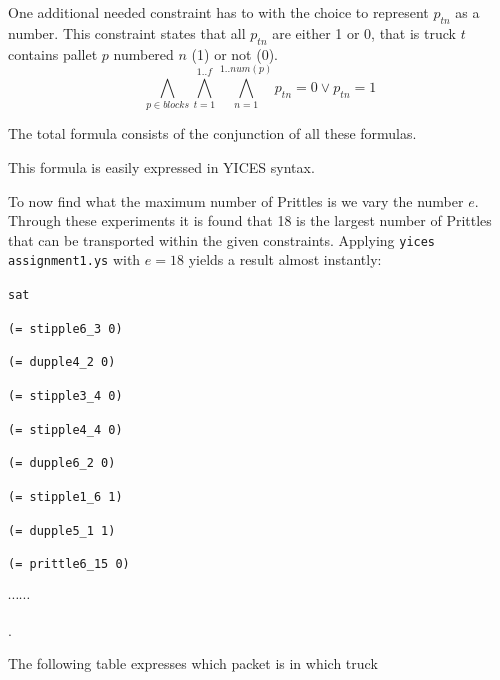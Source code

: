 \documentclass[12pt]{article}
\begin{document}
One additional needed constraint has to with the choice to represent $p_{tn}$
as a number. This constraint states that all $p_{tn}$ are either 1 or 0, that is
truck $t$ contains pallet $p$ numbered $n$ (1) or not (0).
\begin{equation} \label{eq:range}
  \bigwedge_{p \in blocks}  \bigwedge_{t=1}^{1..f} \bigwedge_{n=1}^{1..num(p)} 
	p_{tn} = 0 \vee p_{tn} = 1
\end{equation}

The total formula consists of the conjunction of all these formulas.

This formula is easily expressed in YICES syntax.

To now find what the maximum number of Prittles is we vary the number $e$. 
Through these experiments it is found that 18 is the largest number of Prittles
that can be transported within the given constraints.
Applying {\tt yices assignment1.ys} with $e=18$ yields a result almost 
instantly:

{\footnotesize

{\tt sat }

{\tt (= stipple6\_3 0)}

{\tt (= dupple4\_2 0)}

{\tt (= stipple3\_4 0)}

{\tt (= stipple4\_4 0)}

{\tt (= dupple6\_2 0)}

{\tt (= stipple1\_6 1)}

{\tt (= dupple5\_1 1)}

{\tt (= prittle6\_15 0)}

$\cdots \cdots$ }.

The following table expresses which packet is in which truck

\vspace{3mm}
\end{document}
